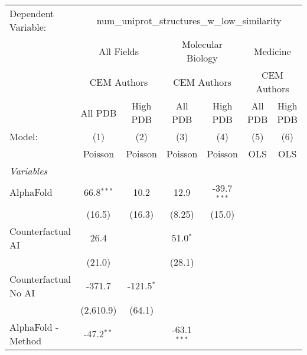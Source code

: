 \begingroup
\centering
\begin{tabular}{lcccccc}
   \tabularnewline \midrule \midrule
   Dependent Variable: & \multicolumn{6}{c}{num\_uniprot\_structures\_w\_low\_similarity}\\
 & \multicolumn{2}{c}{All Fields} & \multicolumn{2}{c}{Molecular Biology} & \multicolumn{2}{c}{Medicine} \\
\cmidrule(lr){2-3} \cmidrule(lr){4-5} \cmidrule(lr){6-7}
 & \multicolumn{2}{c}{CEM Authors} & \multicolumn{2}{c}{CEM Authors} & \multicolumn{2}{c}{CEM Authors} \\
\cmidrule(lr){2-3} \cmidrule(lr){4-5} \cmidrule(lr){6-7}
 & \multicolumn{1}{c}{All PDB} & \multicolumn{1}{c}{High PDB} & \multicolumn{1}{c}{All PDB} & \multicolumn{1}{c}{High PDB} & \multicolumn{1}{c}{All PDB} & \multicolumn{1}{c}{High PDB} \\
\cmidrule(lr){2-2} \cmidrule(lr){3-3} \cmidrule(lr){4-4} \cmidrule(lr){5-5} \cmidrule(lr){6-6} \cmidrule(lr){7-7}
   Model:                                                  & (1)           & (2)          & (3)            & (4)           & (5)  & (6)\\  
                                                           &  Poisson      & Poisson      & Poisson        & Poisson       & OLS  & OLS\\  
   \midrule
   \emph{Variables}\\
   AlphaFold                                               & 66.8$^{***}$  & 10.2         & 12.9           & -39.7$^{***}$ &      &   \\   
                                                           & (16.5)        & (16.3)       & (8.25)         & (15.0)        &      &   \\   
   Counterfactual AI                                       & 26.4          &              & 51.0$^{*}$     &               &      &   \\   
                                                           & (21.0)        &              & (28.1)         &               &      &   \\   
   Counterfactual No AI                                    & -371.7        & -121.5$^{*}$ &                &               &      &   \\   
                                                           & (2,610.9)     & (64.1)       &                &               &      &   \\   
   AlphaFold - Method                                      & -47.2$^{**}$  &              & -63.1$^{***}$  &               &      &   \\   

\end{tabular}
